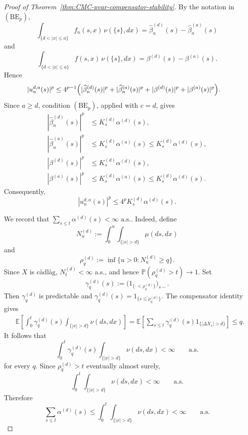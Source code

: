 \documentclass[a4paper,10pt]{article}
\newcommand{\E}{\mathbb E}
\renewcommand{\P}{\mathbb P}
\begin{document}
\begin{proof}[Proof of Theorem~\ref{thm:CMC-pvar-compensator-stability}]
By the notation in \((\mathrm{BE}_p)\),
\[
\int_{\{d<|x|\le a\}}
f_n(s,x)\,\nu(\{s\},dx)
=
\widehat\beta_n^{(d)}(s)
-
\widehat\beta_n^{(a)}(s)
\]
and
\[
\int_{\{d<|x|\le a\}}
f(s,x)\,\nu(\{s\},dx)
=
\beta^{(d)}(s)
-
\beta^{(a)}(s).
\]
Hence
\[
\begin{aligned}
|u_n^{d,a}(s)|^p
&\le
4^{p-1}
\Bigl(
|\widehat\beta_n^{(d)}(s)|^p
+
|\widehat\beta_n^{(a)}(s)|^p
+
|\beta^{(d)}(s)|^p
+
|\beta^{(a)}(s)|^p
\Bigr).
\end{aligned}
\]
Since \(a\ge d\), condition \((\mathrm{BE}_p)\), applied with
\(c=d\), gives
\[
\begin{aligned}
|\widehat\beta_n^{(d)}(s)|^p
&\le K_s^{(d)}\alpha^{(d)}(s),\\
|\widehat\beta_n^{(a)}(s)|^p
&\le K_s^{(d)}\alpha^{(a)}(s)
\le K_s^{(d)}\alpha^{(d)}(s),\\
|\beta^{(d)}(s)|^p
&\le K_s^{(d)}\alpha^{(d)}(s),\\
|\beta^{(a)}(s)|^p
&\le K_s^{(d)}\alpha^{(a)}(s)
\le K_s^{(d)}\alpha^{(d)}(s).
\end{aligned}
\]
Consequently,
\[
        |u_n^{d,a}(s)|^p
        \le
        4^pK_s^{(d)}\alpha^{(d)}(s).
\]

We record that
$
        \sum_{s\le t}\alpha^{(d)}(s)<\infty
        \text{ a.s..}
$
Indeed, define
\[
N_u^{(d)}
:=
\int_0^u\int_{\{|x|>d\}}\mu(ds,dx)
\]
and
\[
\rho_q^{(d)}
:=
\inf\{u>0:N_u^{(d)}\ge q\}.
\]
Since \(X\) is càdlàg,
$
        N_t^{(d)}<\infty
$
a.s., and hence
$
        \P(\rho_q^{(d)}>t)\longrightarrow1.
$
Set
\[
        \gamma_q^{(d)}(s)
        :=
        \bigl(1_{\{\cdot<\rho_q^{(d)}\}}\bigr)_{s-}.
\]
Then \(\gamma_q^{(d)}\) is predictable and
$
        \gamma_q^{(d)}(s)
        =
        1_{\{s\le\rho_q^{(d)}\}}.
$
The compensator identity gives
\[
\begin{aligned}
&\E\left[
\int_0^t
\gamma_q^{(d)}(s)
\int_{\{|x|>d\}}\nu(ds,dx)
\right]
=
\E\left[
\sum_{s\le t}
\gamma_q^{(d)}(s)
1_{\{|\Delta X_s|>d\}}
\right]
\le q.
\end{aligned}
\]
It follows that
\[
\int_0^t
\gamma_q^{(d)}(s)
\int_{\{|x|>d\}}\nu(ds,dx)
<\infty
\qquad\text{a.s.}
\]
for every \(q\). Since \(\rho_q^{(d)}>t\) eventually almost surely,
\[
\int_0^t\int_{\{|x|>d\}}\nu(ds,dx)<\infty
\qquad\text{a.s.}
\]
Therefore
\[
\sum_{s\le t}\alpha^{(d)}(s)
\le
\int_0^t\int_{\{|x|>d\}}\nu(ds,dx)
<\infty
\qquad\text{a.s.}
\]


\end{proof}
\end{document}
